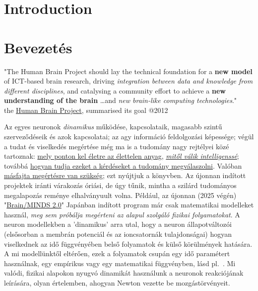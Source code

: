 
\ifx\magyar\undefined
\chapter{Introduction\label{ch:Introduction}}
\else
\chapter{Bevezetés\label{ch:Introduction}}
\fi
\iflatexml
\else
\minitoc
\fi


\quotationbox
{"The Human Brain Project should lay the technical foundation for a \textbf{new model} of ICT-based brain research, driving \textit{integration between data and knowledge from different disciplines}, and catalysing a community effort to achieve a \textbf{new understanding of the brain}%
\dots and \textit{new brain-like computing technologies}."\\
{the \href{https://www.humanbrainproject.eu/en/}{Human Brain Project},  summarised its goal @2012}}

Az egyes neuronok \textit{dinamikus} működése, kapcsolataik,
magasabb szintű szer\-veződéseik és azok kapcsolatai;
az agy információ feldolgozási képessége; végül 
a tudat és viselkedés megértése még ma is a tudomány 
nagy rejtélyei közé tartoznak:
\hyperlink{LivingMatter}
{mely ponton kel életre az élettelen anyag}, \textit{\hyperlink{CognitiveMatter}{mitől válik intelligenssé}}; továbbá \hyperlink{PhysicalPictureNeuron}{hogyan tudja ezeket a kérdéseket a tudomány megválaszolni}. 
Valóban \hyperlink{NewUnderstanding}
{másfajta megértésre van szükség}; ezt nyújtjuk a könyvben.
%
Az újonnan indított projektek iránti várakozás óriási, 
de úgy tűnik, mintha a szilárd tudományos megalapozás reménye
elhalványuult volna.
Például, az újonnan (2025 végén) "\href{https://brainminds.jp/en}{Brain/MINDS 2.0}" Japánban indított program  már csak 
matematikai modelleket használ, \textit{meg sem próbálja megérteni az alapul szolgáló fizikai folyamatokat}.
A neuron model\-lekben a 'dinamikus' arra utal, hogy a neuron
állapotváltozói (elsősorban a membrán potenciál és az ion\-csatornák tulajdonságai) hogyan viselkednek az idő függvényében belső folyamatok és külső körülmények hatására.
A mi model\-lünktől eltérően, ezek a folyamatok csupán egy 
idő paramétert használnak, egy empírikus vagy egy matematikai függvényben, lásd pl.~\cite{NeuralDynamicsGertsner:2014}.
Mi valódi, fizikai alapokon nyugvó dinamikát használunk a neuronok reakciójának leírására, olyan értelemben, ahogyan Newton vezette be mozgástörvényeit.

